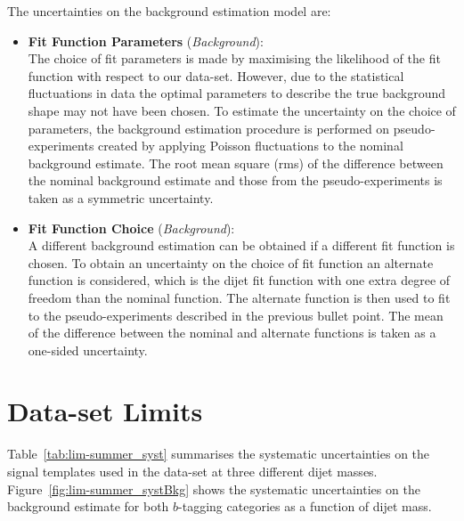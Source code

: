 \noindent
The uncertainties on the background estimation model are:
\begin{itemize}[leftmargin=*]
\item \textbf{Fit Function Parameters} \hspace{1mm} (\textit{Background}):\\
  The choice of fit parameters is made by maximising the likelihood of the fit function with respect to our data-set.
  However, due to the statistical fluctuations in data the optimal parameters to describe
  the true background shape may not have been chosen.
  To estimate the uncertainty on the choice of parameters,
  the background estimation procedure is performed on pseudo-experiments created by applying Poisson fluctuations to the nominal background estimate.
  The root mean square (rms) of the difference between the nominal background estimate and those from the pseudo-experiments is taken as a symmetric uncertainty. \vspace{0.5em}
\item\textbf{Fit Function Choice}  \hspace{1mm} (\textit{Background}):\\
  A different background estimation can be obtained if a different fit function is chosen.
  To obtain an uncertainty on the choice of fit function an alternate function is considered,
  which is the dijet fit function with one extra degree of freedom than the nominal function.
  The alternate function is then used to fit to the pseudo-experiments described in the previous bullet point.
  The mean of the difference between the nominal and alternate functions is taken as a one-sided uncertainty.
  \vspace{0.5em}
\end{itemize}

\clearpage
\section{\summer{} Data-set Limits}
\label{sec:lim-summer}

Table~\ref{tab:lim-summer_syst} summarises the systematic uncertainties
on the signal templates used in the \summer{} data-set at
three different dijet masses.
Figure~\ref{fig:lim-summer_systBkg} shows the systematic uncertainties on the background estimate
for both $b$-tagging categories as a function of dijet mass.

